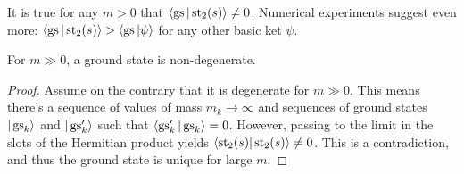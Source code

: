 \begin{conj}
It is true for any $m > 0$ that $\langle \operatorname{gs}|\operatorname{st}_2(s)\rangle \neq 0$. Numerical experiments suggest even more: $\langle \operatorname{gs} | \operatorname{st}_2(s)\rangle > \langle \operatorname{gs} | \psi \rangle$ for any other basic ket $\psi$.
\end{conj}


\begin{proposition}\label{p:large_mass_nondeg}
For $m \gg 0$, a ground state is non-degenerate.
\end{proposition}
\begin{proof}
Assume on the contrary that it is degenerate for $m \gg 0$. This means there's a sequence of values of mass $m_k \rightarrow \infty$ and sequences of ground states $|\operatorname{gs}_k\rangle$ and $|\operatorname{gs}^\prime_k\rangle$ such that $\langle\operatorname{gs}_k^\prime|\operatorname{gs}_k\rangle = 0$. However, passing to the limit in the slots of the Hermitian product yields $\langle \operatorname{st}_2(s) | \operatorname{st}_2(s) \rangle \neq 0$. This is a contradiction, and thus the ground state is unique for large $m$.
\end{proof}

